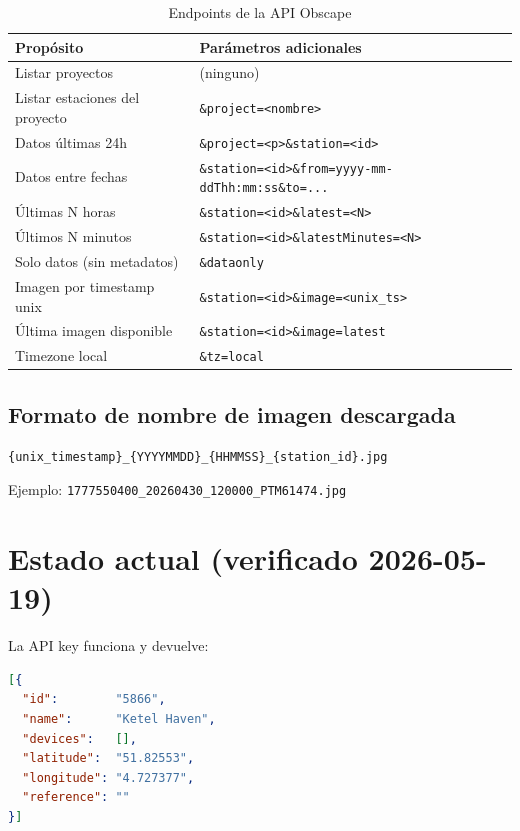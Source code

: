 \begin{table}[h!]
\centering
\begin{tabular}{lp{8.5cm}}
\toprule
\textbf{Propósito} & \textbf{Parámetros adicionales} \\
\midrule
Listar proyectos                & (ninguno) \\
Listar estaciones del proyecto  & \texttt{\&project=<nombre>} \\
Datos últimas 24h               & \texttt{\&project=<p>\&station=<id>} \\
Datos entre fechas              & \texttt{\&station=<id>\&from=yyyy-mm-ddThh:mm:ss\&to=...} \\
Últimas N horas                 & \texttt{\&station=<id>\&latest=<N>} \\
Últimos N minutos               & \texttt{\&station=<id>\&latestMinutes=<N>} \\
Solo datos (sin metadatos)      & \texttt{\&dataonly} \\
Imagen por timestamp unix       & \texttt{\&station=<id>\&image=<unix\_ts>} \\
Última imagen disponible        & \texttt{\&station=<id>\&image=latest} \\
Timezone local                  & \texttt{\&tz=local} \\
\bottomrule
\end{tabular}
\caption{Endpoints de la API Obscape}
\end{table}

\subsection{Formato de nombre de imagen descargada}

\begin{Verbatim}
{unix_timestamp}_{YYYYMMDD}_{HHMMSS}_{station_id}.jpg
\end{Verbatim}
Ejemplo: \texttt{1777550400\_20260430\_120000\_PTM61474.jpg}

\section{Estado actual (verificado 2026-05-19)}

La API key funciona y devuelve:
\begin{lstlisting}[language=json]
[{
  "id":        "5866",
  "name":      "Ketel Haven",
  "devices":   [],
  "latitude":  "51.82553",
  "longitude": "4.727377",
  "reference": ""
}]
\end{lstlisting}

